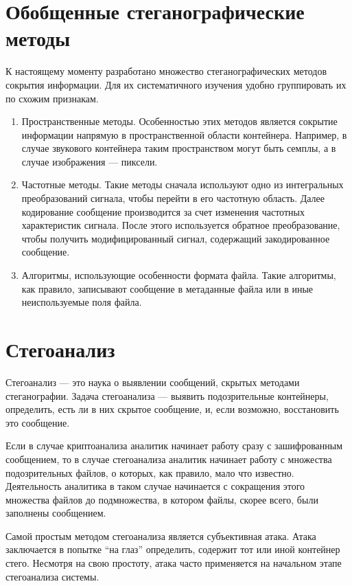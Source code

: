 \section{Обобщенные стеганографические методы}
К настоящему моменту разработано множество стеганографических методов сокрытия информации.
Для их систематичного изучения удобно группировать их по схожим признакам.
\begin{enumerate}
    \item Пространственные методы. Особенностью этих методов является сокрытие информации напрямую
    в пространственной области контейнера. Например,
    в случае звукового контейнера таким пространством могут быть семплы,
    а в случае изображения --- пиксели.
    \item Частотные методы. Такие методы сначала используют одно из интегральных преобразований сигнала,
    чтобы перейти в его частотную область. Далее кодирование сообщение производится за счет изменения частотных
    характеристик сигнала. После этого используется обратное преобразование, чтобы получить модифицированный сигнал,
    содержащий закодированное сообщение.
    \item Алгоритмы, использующие особенности формата файла. Такие алгоритмы, как правило, записывают
    сообщение в метаданные файла или в иные неиспользуемые поля файла.
\end{enumerate}

\section{Стегоанализ}
Стегоанализ --- это наука о выявлении сообщений, скрытых методами стеганографии.
Задача стегоанализа --- выявить подозрительные контейнеры, определить, есть ли в них скрытое сообщение,
и, если возможно, восстановить это сообщение.

Если в случае криптоанализа аналитик начинает работу сразу с зашифрованным сообщением,
то в случае стегоанализа аналитик начинает работу с множества подозрительных файлов,
о которых, как правило, мало что известно. Деятельность аналитика в таком случае
начинается с сокращения этого множества файлов до подмножества, в котором файлы,
скорее всего, были заполнены сообщением.

Самой простым методом стегоанализа является субъективная атака. Атака заключается
в попытке ``на глаз'' определить, содержит тот или иной контейнер стего. Несмотря
на свою простоту, атака часто применяется на начальном этапе стегоанализа системы.

